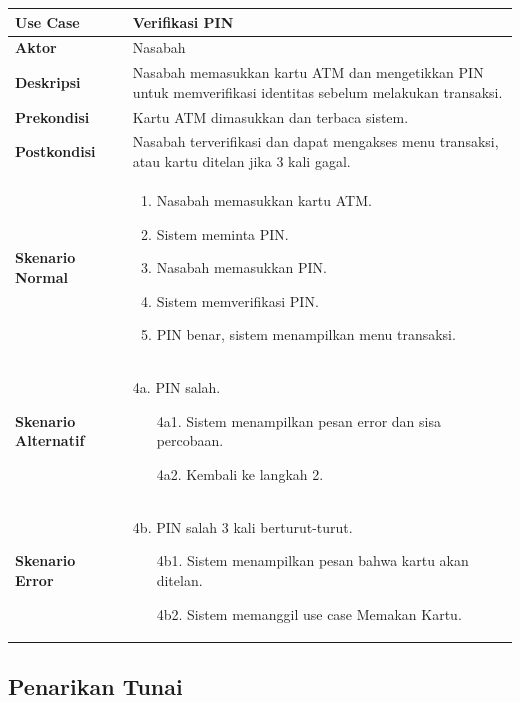 \documentclass[conference,10pt]{IEEEtran}
\begin{document}
\begin{center}
\begin{tabular}{|L{2.3cm}|L{5cm}|}
\hline
\textbf{Use Case} & Verifikasi PIN \\
\hline
\textbf{Aktor} & Nasabah \\
\hline
\textbf{Deskripsi} & Nasabah memasukkan kartu ATM dan mengetikkan PIN untuk memverifikasi identitas sebelum melakukan transaksi. \\
\hline
\textbf{Prekondisi} & Kartu ATM dimasukkan dan terbaca sistem. \\
\hline
\textbf{Postkondisi} & Nasabah terverifikasi dan dapat mengakses menu transaksi, atau kartu ditelan jika 3 kali gagal. \\
\hline
\textbf{Skenario Normal} &
\begin{enumerate}
\setlength\itemsep{0pt}
\item Nasabah memasukkan kartu ATM.
\item Sistem meminta PIN.
\item Nasabah memasukkan PIN.
\item Sistem memverifikasi PIN.
\item PIN benar, sistem menampilkan menu transaksi.
\end{enumerate} \\
\hline
\textbf{Skenario Alternatif} &
4a. PIN salah.
\begin{enumerate}
\setlength\itemsep{0pt}
\item[4a1.] Sistem menampilkan pesan error dan sisa percobaan.
\item[4a2.] Kembali ke langkah 2.
\end{enumerate} \\
\hline
\textbf{Skenario Error} &
4b. PIN salah 3 kali berturut-turut.
\begin{enumerate}
\setlength\itemsep{0pt}
\item[4b1.] Sistem menampilkan pesan bahwa kartu akan ditelan.
\item[4b2.] Sistem memanggil use case Memakan Kartu.
\end{enumerate} \\
\hline
\end{tabular}
\end{center}

\subsection{Penarikan Tunai}
\end{document}
